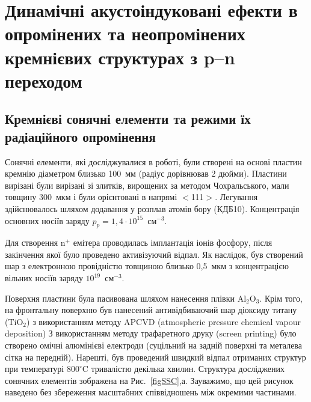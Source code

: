 \documentclass[a4paper,14pt,oneside,openany]{memoir}
\begin{document}










%

\chapter{Динамічні акустоіндуковані ефекти в опромінених та неопромінених кремнієвих структурах з p--n переходом\label{Ch_SSC}}
\section{Кремнієві сонячні елементи та режими їх радіаційного опромінення\label{SSC}}
Сонячні елементи, які досліджувалися в роботі, були створені на основі пластин кремнію діаметром близько 100~мм (радіус дорівнював 2 дюйми).
Пластини вирізані були вирізані зі злитків, вирощених за методом Чохральського, мали товщину 300~мкм і були орієнтовані в напрямі $<$111$>$.
Легування здійснювалось шляхом додавання у розплав атомів бору (КДБ10).
Концентрація основних носіїв заряду $p_p=1,4\cdot10^{15}$~см$^{-3}$.

Для створення n$^+$ емітера проводилась імплантація іонів фосфору, після закінчення якої було проведено активізуючий відпал.
Як наслідок, був створений шар з електронною провідністю товщиною близько  0,5~мкм з концентрацією вільних носіїв заряду $10^{19}$~см$^{-3}$.

Поверхня пластини була пасивована шляхом нанесення плівки Al$_2$O$_3$.
Крім того, на фронтальну поверхню був нанесений антивідбиваючий шар діоксиду титану (TiO$_2$) з використанням методу APCVD (atmospheric pressure chemical  vapour  deposition)
З використанням методу трафаретного друку (screen printing) було створено омічні алюмінієві електроди (суцільний на задній поверхні та металева сітка на передній).
Нарешті, був проведений швидкий відпал отриманих структур при температурі $800^\circ$C тривалістю декілька хвилин.
Структура досліджених сонячних елементів зображена на Рис.~\ref{figSSC},а.
Зауважимо, що цей рисунок наведено без збереження масштабних співвідношень між окремими частинами.
\end{document}
